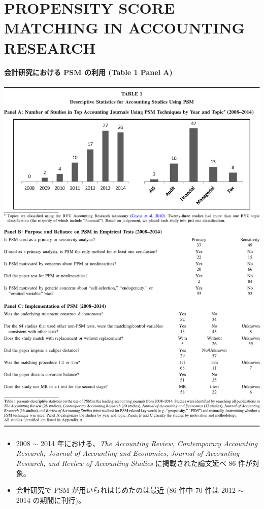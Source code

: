 \section{PROPENSITY SCORE MATCHING IN ACCOUNTING RESEARCH}

\paragraph{会計研究における PSM の利用 (Table 1 Panel A)}

\begin{table}
 \centering
 \includegraphics[width=14cm]{../table/tbl01.pdf}
\end{table}

\begin{itemize}
 \item 2008 $\sim$ 2014 年における、\textit{The Accounting Review,
       Contemporary Accounting Research, Journal of Accounting and
       Economics, Journal of Accounting Research, and Review of
       Accounting Studies} に掲載された論文延べ 86 件が対象。
 \item 会計研究で PSM が用いられはじめたのは最近 (86 件中 70 件は 2012
       $\sim$ 2014 の期間に刊行)。
\end{itemize}


